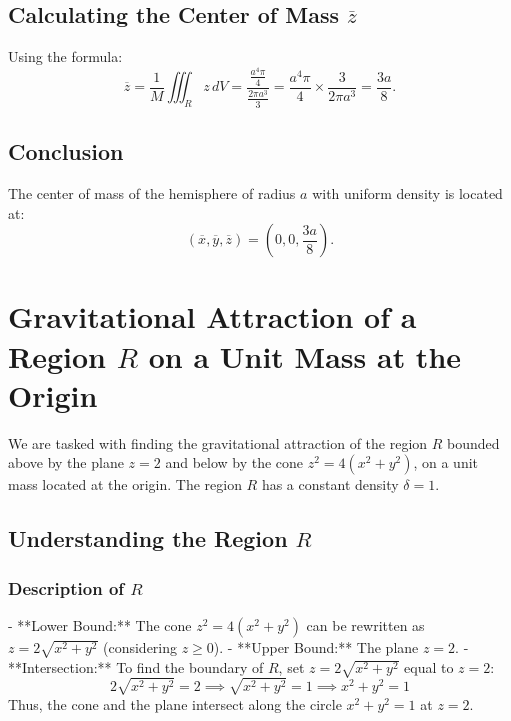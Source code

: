 \documentclass[11pt]{article}
\begin{document}
\newpage

\subsection{Calculating the Center of Mass \( \overline{z} \)}

Using the formula:
\[
\overline{z} = \frac{1}{M} \iiint_{R} z \, dV = \frac{\frac{a^4 \pi}{4}}{\frac{2\pi a^3}{3}} = \frac{a^4 \pi}{4} \times \frac{3}{2\pi a^3} = \frac{3a}{8}.
\]

\newpage

\subsection{Conclusion}

The center of mass of the hemisphere of radius \( a \) with uniform density is located at:
\[
\left( \overline{x}, \overline{y}, \overline{z} \right) = \left( 0, 0, \frac{3a}{8} \right).
\]




\newpage

\section{Gravitational Attraction of a Region \( R \) on a Unit Mass at the Origin}

We are tasked with finding the gravitational attraction of the region \( R \) bounded above by the plane \( z = 2 \) and below by the cone \( z^2 = 4(x^2 + y^2) \), on a unit mass located at the origin. The region \( R \) has a constant density \( \delta = 1 \).

\newpage

\subsection{Understanding the Region \( R \)}

\subsubsection*{Description of \( R \)}
- **Lower Bound:** The cone \( z^2 = 4(x^2 + y^2) \) can be rewritten as \( z = 2\sqrt{x^2 + y^2} \) (considering \( z \geq 0 \)).
- **Upper Bound:** The plane \( z = 2 \).
- **Intersection:** To find the boundary of \( R \), set \( z = 2\sqrt{x^2 + y^2} \) equal to \( z = 2 \):
  \[
  2\sqrt{x^2 + y^2} = 2 \implies \sqrt{x^2 + y^2} = 1 \implies x^2 + y^2 = 1
  \]
  Thus, the cone and the plane intersect along the circle \( x^2 + y^2 = 1 \) at \( z = 2 \).
\end{document}
